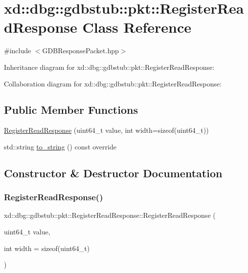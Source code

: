\hypertarget{classxd_1_1dbg_1_1gdbstub_1_1pkt_1_1_register_read_response}{}\section{xd\+:\+:dbg\+:\+:gdbstub\+:\+:pkt\+:\+:Register\+Read\+Response Class Reference}
\label{classxd_1_1dbg_1_1gdbstub_1_1pkt_1_1_register_read_response}


{\ttfamily \#include $<$G\+D\+B\+Response\+Packet.\+hpp$>$}



Inheritance diagram for xd\+:\+:dbg\+:\+:gdbstub\+:\+:pkt\+:\+:Register\+Read\+Response\+:


Collaboration diagram for xd\+:\+:dbg\+:\+:gdbstub\+:\+:pkt\+:\+:Register\+Read\+Response\+:
\subsection*{Public Member Functions}
\begin{DoxyCompactItemize}
\item 
\mbox{\hyperlink{classxd_1_1dbg_1_1gdbstub_1_1pkt_1_1_register_read_response_adf1673eb8070d28e0f9d21527aaa3eff}{Register\+Read\+Response}} (uint64\+\_\+t value, int width=sizeof(uint64\+\_\+t))
\item 
std\+::string \mbox{\hyperlink{classxd_1_1dbg_1_1gdbstub_1_1pkt_1_1_register_read_response_a3eeffab928cc7e45c86656ffe8c53608}{to\+\_\+string}} () const override
\end{DoxyCompactItemize}


\subsection{Constructor \& Destructor Documentation}
\mbox{\label{classxd_1_1dbg_1_1gdbstub_1_1pkt_1_1_register_read_response_adf1673eb8070d28e0f9d21527aaa3eff}} 
\subsubsection{\texorpdfstring{Register\+Read\+Response()}{RegisterReadResponse()}}
{\footnotesize\ttfamily xd\+::dbg\+::gdbstub\+::pkt\+::\+Register\+Read\+Response\+::\+Register\+Read\+Response (\begin{DoxyParamCaption}\item[{uint64\+\_\+t}]{value,  }\item[{int}]{width = {\ttfamily sizeof(uint64\+\_\+t)} }\end{DoxyParamCaption})\hspace{0.3cm}{\ttfamily [inline]}}



